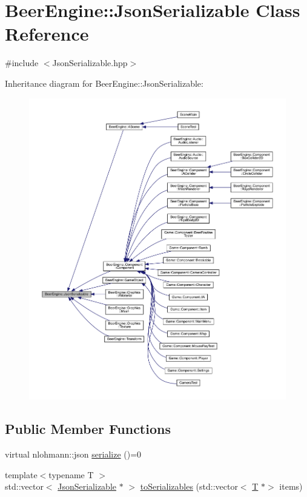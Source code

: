 \hypertarget{class_beer_engine_1_1_json_serializable}{}\section{Beer\+Engine\+:\+:Json\+Serializable Class Reference}
\label{class_beer_engine_1_1_json_serializable}


{\ttfamily \#include $<$Json\+Serializable.\+hpp$>$}



Inheritance diagram for Beer\+Engine\+:\+:Json\+Serializable\+:
\nopagebreak
\begin{figure}[H]
\begin{center}
\leavevmode
\includegraphics[width=350pt]{class_beer_engine_1_1_json_serializable__inherit__graph}
\end{center}
\end{figure}
\subsection*{Public Member Functions}
\begin{DoxyCompactItemize}
\item 
virtual nlohmann\+::json \mbox{\hyperlink{class_beer_engine_1_1_json_serializable_a17689cbd8fe282c570bd026cc1be5b3b}{serialize}} ()=0
\item 
{\footnotesize template$<$typename T $>$ }\\std\+::vector$<$ \mbox{\hyperlink{class_beer_engine_1_1_json_serializable}{Json\+Serializable}} $\ast$ $>$ \mbox{\hyperlink{class_beer_engine_1_1_json_serializable_a80649111ff7da289151d17201f9e1d19}{to\+Serializables}} (std\+::vector$<$ \mbox{\hyperlink{namespace_beer_engine_a94f0b552f6dc910de8cdb44207981f53a8de48e594408f9fc561b2f68ce05f664}{T}} $\ast$$>$ items)
\end{DoxyCompactItemize}
